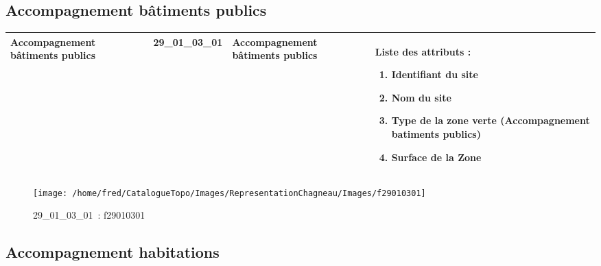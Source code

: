 \documentclass[12pt,titlepage]{book}
\begin{document}
\subsection{Accompagnement bâtiments publics}
\noindent
\vspace{\baselineskip}

\renewcommand{\arraystretch}{1.2}
\begin{supertabular}{|p{10cm}|c|p{13cm}|p{12cm}|}
 Accompagnement bâtiments publics & 29\_01\_03\_01 & Accompagnement bâtiments publics & Liste des attributs :
\begin{enumerate}
  \item Identifiant du site  \item Nom du site  \item Type de la zone verte (Accompagnement batiments publics)  \item Surface de la Zone\end{enumerate}
\\
\hline
\end{supertabular}
\begin{figure}[h!]
  \hfill         %
  \begin{minipage}[t]{3cm}
    \begin{center}
      \texttt{[image: /home/fred/CatalogueTopo/Images/RepresentationChagneau/Images/f29010301]}
      \caption[~29\_01\_03\_01]{\small{29\_01\_03\_01~:} \tiny{f29010301}}\label{f29010301}
    \end{center}
  \end{minipage}
\end{figure}


\subsection{Accompagnement habitations}
\noindent
\vspace{\baselineskip}
\end{document}
